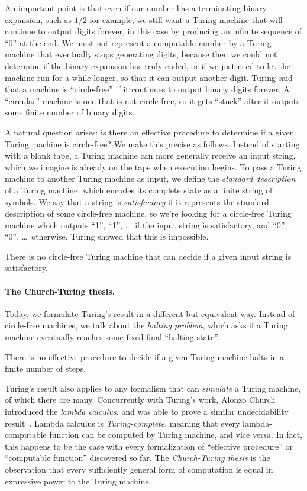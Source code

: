 \documentclass[../generics]{subfiles}
\begin{document}
An important point is that even if our number has a terminating binary expansion, such as $1/2$ for example, we still want a Turing machine that will continue to output digits forever, in this case by producing an infinite sequence of ``0'' at the end. We must not represent a computable number by a Turing machine that eventually stops generating digits, because then we could not determine if the binary expansion has truly ended, or if we just need to let the machine run for a while longer, so that it can output another digit. Turing said that a machine is ``circle-free'' if it continues to output binary digits forever. A ``circular'' machine is one that is not circle-free, so it gets ``stuck'' after it outputs some finite number of binary digits.

A natural question arises: is there an effective procedure to determine if a given Turing machine is circle-free? We make this precise as follows. Instead of starting with a blank tape, a Turing machine can more generally receive an input string, which we imagine is already on the tape when execution begins. To pass a Turing machine to another Turing machine as input, we define the \emph{standard description} of a Turing machine, which encodes its complete state as a finite string of symbols. We say that a string is \emph{satisfactory} if it represents the standard description of some circle-free machine, so we're looking for a circle-free Turing machine which outputs ``1'', ``1'', \ldots\ if the input string is satisfactory, and ``0'', ``0'', \ldots\ otherwise. Turing showed that this is impossible.
\begin{theorem}
There is no circle-free Turing machine that can decide if a given input string is satisfactory.
\end{theorem}

\paragraph{The Church-Turing thesis.}
Today, we formulate Turing's result in a different but equivalent way. Instead of circle-free machines, we talk about the \emph{halting problem}, which asks if a Turing machine eventually reaches some fixed final ``halting state'':
\begin{theorem}\label{turing thm}
There is no effective procedure to decide if a given Turing machine halts in a finite number of steps.
\end{theorem}
Turing's result also applies to any formalism that can \emph{simulate} a Turing machine, of which there are many. Concurrently with Turing's work, Alonzo Church introduced the \emph{lambda calculus}, and was able to prove a similar undecidability result~\cite{church}. Lambda calculus is \emph{Turing-complete}, meaning that every lambda-computable function can be computed by Turing machine, and vice versa. In fact, this happens to be the case with every formalization of ``effective procedure'' or ``computable function'' discovered so far. The \emph{Church-Turing thesis} is the observation that every sufficiently general form of computation is equal in expressive power to the Turing machine.
\end{document}
